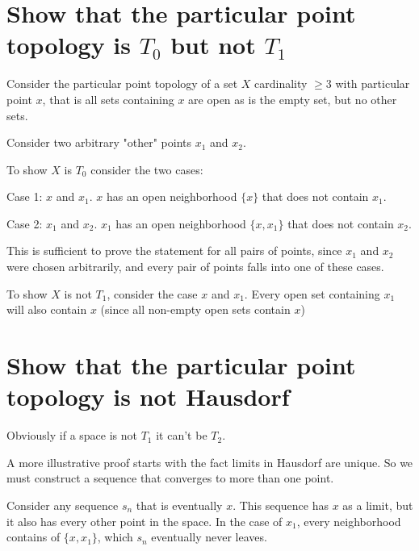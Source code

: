 \documentclass{article}
\begin{document}
\section{Show that the particular point topology is $T_0$ but not $T_1$}

Consider the particular point topology of a set $X$ cardinality $\ge 3$ with particular point $x$, that is all sets containing $x$ are open as is the empty set, but no other sets.

Consider two arbitrary "other" points $x_1$ and $x_2$. 

To show $X$ is $T_0$ consider the two cases:

Case 1: $x$ and $x_1$. $x$ has an open neighborhood $\{x\}$ that does not contain $x_1$.

Case 2: $x_1$ and $x_2$. $x_1$ has an open neighborhood $\{x, x_1\}$ that does not contain $x_2$.

This is sufficient to prove the statement for all pairs of points, since $x_1$ and $x_2$ were chosen arbitrarily, and every pair of points falls into one of these cases.

To show $X$ is not $T_1$, consider the case $x$ and $x_1$. Every open set containing $x_1$ will also contain $x$ (since all non-empty open sets contain $x$)

\section{Show that the particular point topology is not Hausdorf}

Obviously if a space is not $T_1$ it can't be $T_2$.

A more illustrative proof starts with the fact limits in Hausdorf are unique. So we must construct a sequence that converges to more than one point.

Consider any sequence $s_n$ that is eventually $x$. This sequence has $x$ as a limit, but it also has every other point in the space. In the case of $x_1$, every neighborhood contains of $\{x, x_1\}$, which $s_n$ eventually never leaves.
\end{document}
